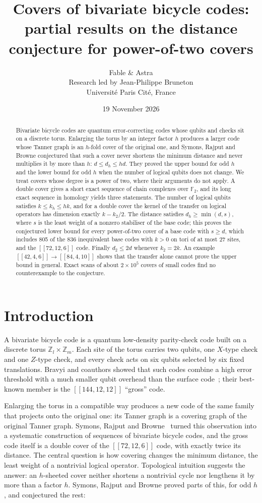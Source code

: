 \documentclass[11pt,a4paper]{article}
\title{Covers of bivariate bicycle codes:\\
partial results on the distance conjecture for power-of-two covers}
\author{Fable \& Astra\\[0.35em]
\normalsize Research led by Jean-Philippe Bruneton\\[-0.1em]
\small Universit\'e Paris Cit\'e, France}
\date{19 November 2026}
\theoremstyle{definition}
\theoremstyle{plain}
\newcommand{\F}{\mathbb{F}_2}
\newcommand{\Z}{\mathbb{Z}}
\newcommand{\code}[1]{[\![#1]\!]}
\begin{document}
\maketitle
\begin{abstract}
Bivariate bicycle codes are quantum error-correcting codes whose qubits and
checks sit on a discrete torus. Enlarging the torus by an integer factor $h$
produces a larger code whose Tanner graph is an $h$-fold cover of the
original one, and Symons, Rajput and Browne conjectured that such a cover
never shortens the minimum distance and never multiplies it by more than $h$:
$d\le d_h\le hd$. They proved the upper bound for odd $h$ and the lower bound
for odd $h$ when the number of logical qubits does not change. We treat
covers whose degree is a power of two, where their arguments do not apply. A
double cover gives a short exact sequence of chain complexes over $\F$, and
its long exact sequence in homology yields three statements. The number of
logical qubits satisfies $k\le k_h\le hk$, and for a double cover the kernel
of the transfer on logical operators has dimension exactly $k-k_2/2$. The
distance satisfies $d_h\ge\min(d,s)$, where $s$ is the least weight of a
nonzero stabiliser of the base code; this proves the conjectured lower bound
for every power-of-two cover of a base code with $s\ge d$, which includes
805 of the 836 inequivalent base codes with $k>0$ on tori of at most $27$ sites, and the
$\code{72,12,6}$ code. Finally $d_2\le2d$ whenever $k_2=2k$. An example
$\code{42,4,6}\to\code{84,4,10}$ shows that the transfer alone cannot prove
the upper bound in general. Exact scans of about $2\times10^5$ covers of small
codes find no counterexample to the conjecture.
\end{abstract}

\section{Introduction}
A bivariate bicycle code is a quantum low-density parity-check code built on
a discrete torus $\Z_l\times\Z_m$. Each site of the torus carries two qubits,
one $X$-type check and one $Z$-type check, and every check acts on six qubits
selected by six fixed translations. Bravyi and coauthors showed that such
codes combine a high error threshold with a much smaller qubit overhead than
the surface code~\cite{Bravyi2024}; their best-known member is the
$\code{144,12,12}$ ``gross'' code.

Enlarging the torus in a compatible way produces a new code of the same family
that projects onto the original one: its Tanner graph is a covering graph of
the original Tanner graph. Symons, Rajput and Browne~\cite{Symons2025} turned
this observation into a systematic construction of sequences of bivariate
bicycle codes, and the gross code itself is a double cover of the
$\code{72,12,6}$ code, with exactly twice its distance. The central question
is how covering changes the minimum distance, the least weight of a
nontrivial logical operator. Topological intuition suggests the answer: an
$h$-sheeted cover neither shortens a nontrivial cycle nor lengthens it by more
than a factor $h$. Symons, Rajput and Browne proved parts of this, for odd $h$,
and conjectured the rest:
\end{document}

